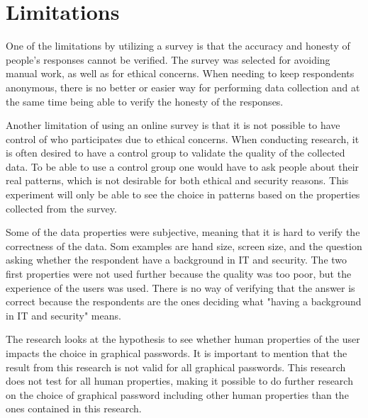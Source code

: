   \section{Limitations}\label{sec:limitations}
    One of the limitations by utilizing a survey is that the accuracy and honesty of people's responses cannot be verified. The survey was selected for avoiding manual work, as well as for ethical concerns. When needing to keep respondents anonymous, there is no better or easier way for performing data collection and at the same time being able to verify the honesty of the responses. 

    Another limitation of using an online survey is that it is not possible to have control of who participates due to ethical concerns. When conducting research, it is often desired to have a control group to validate the quality of the collected data. To be able to use a control group one would have to ask people about their real patterns, which is not desirable for both ethical and security reasons. This experiment will only be able to see the choice in patterns based on the properties collected from the survey.

    Some of the data properties were subjective, meaning that it is hard to verify the correctness of the data. Som examples are hand size, screen size, and the question asking whether the respondent have a background in IT and security. The two first properties were not used further because the quality was too poor, but the experience of the users was used. There is no way of verifying that the answer is correct because the respondents are the ones deciding what "having a background in IT and security" means. 

    The research looks at the hypothesis to see whether human properties of the user impacts the choice in graphical passwords. It is important to mention that the result from this research is not valid for all graphical passwords. This research does not test for all human properties, making it possible to do further research on the choice of graphical password including other human properties than the ones contained in this research. 

